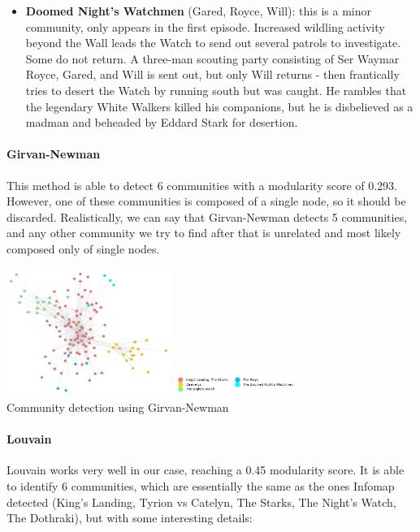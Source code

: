 \documentclass[10pt,twocolumn,letterpaper]{article}
\begin{document}
\begin{itemize}
    \item \textbf{Doomed Night's Watchmen} (Gared, Royce, Will): this is a minor community, only appears in the first episode. Increased wildling activity beyond the Wall leads the Watch to send out several patrols to investigate. Some do not return. A three-man scouting party consisting of Ser Waymar Royce, Gared, and Will is sent out, but only Will returns - then frantically tries to desert the Watch by running south but was caught. He rambles that the legendary White Walkers killed his companions, but he is disbelieved as a madman and beheaded by Eddard Stark for desertion.
\end{itemize}


\paragraph{Girvan-Newman}

This method is able to detect 6 communities with a modularity score of 0.293. However, one of these communities is composed of a single node, so it should be discarded. Realistically, we can say that Girvan-Newman detects 5 communities, and any other community we try to find after that is unrelated and most likely composed only of single nodes.

\begin{center}
    \includegraphics[width=0.4\textwidth]{img/s1/communties_g-n.jpg}
    \includegraphics[width=0.3\textwidth]{img/s1/g-n_legend.jpg} \\
    \caption{\small{Community detection using Girvan-Newman}}
\end{center}

\paragraph{Louvain}

Louvain works very well in our case, reaching a 0.45 modularity score. It is able to identify 6 communities, which are essentially the same as the ones Infomap detected (King's Landing, Tyrion vs Catelyn, The Starks, The Night's Watch, The Dothraki), but with some interesting details:
\end{document}
